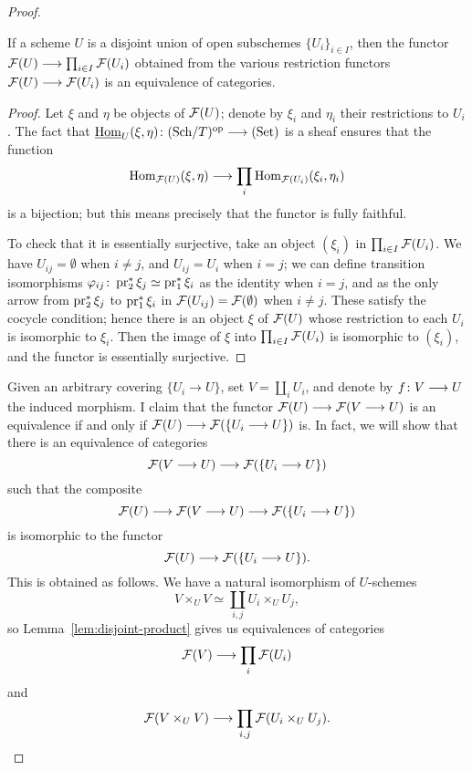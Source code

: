 \begin{4   STACKS}
\begin{4.2 Descent for quasi-coherent sheaves}
\begin{proof}
\begin{lemma}\label{lem:disjoint-product}
If a scheme $U$ is a disjoint union of open subschemes $\{U_i\}_{i \in I}$, then the functor $\cF(U) \arr \prod_{i \in I} \cF(U_i)$ obtained from the various restriction functors $\cF(U) \arr \cF(U_i)$ is an equivalence of categories.
\end{lemma}

\begin{proof}
Let $\xi$ and $\eta$ be objects of $\mathcal{F}(U)$; denote by $\xi_i$ and $\eta_i$ their restrictions to $U_i$. The fact that $\underhom_U(\xi, \eta) \colon \catsch{T}\op \arr \catset$ is a sheaf ensures that the function
   \[
   \hom_{\cF(U)}(\xi, \eta) \arr
   \prod_i \hom_{\cF(U_i)}(\xi_i, \eta_i)
   \]
is a bijection; but this means precisely that the functor is fully faithful.

To check that it is essentially surjective, take an object $(\xi_i)$ in $\prod_{i \in I}\mathcal{F}(U_i)$. We have $U_{ij} = \emptyset$ when $i \neq j$, and $U_{ij} = U_i$ when $i = j$; we can define transition isomorphisms $\varphi_{ij} \colon \operatorname{pr}_2^* \xi_j \simeq \operatorname{pr}_1^* \xi_i$ as the identity when $i = j$, and as the only arrow from $\operatorname{pr}_2^* \xi_j$ to $\operatorname{pr}_1^* \xi_i$ in $\mathcal{F}(U_{ij}) = \mathcal{F}(\emptyset)$  when $i \neq j$. These satisfy the cocycle condition; hence there is an object $\xi$ of $\mathcal{F}(U)$ whose restriction to each $U_i$ is isomorphic to $\xi_i$. Then the image of $\xi$ into $\prod_{i \in I} \mathcal{F}(U_i)$ is isomorphic to $(\xi_i)$, and the functor is essentially surjective.
\end{proof}

Given an arbitrary covering $\{U_i \to U\}$, set $V = \coprod_i U_i$, and denote by $f \colon V \arr U$ the induced morphism. I claim that the functor $\cF(U) \arr \cF(V \to U)$ is an equivalence if and only if $\cF(U) \arr \cF(\{U_i \to U\})$ is. In fact, we will show that there is an equivalence of categories
   \[
   \cF(V \to U) \arr \cF(\{U_i \to U\})
   \]
such that the composite
   \[
   \cF(U) \arr \cF(V \to U)
   \arr \cF(\{U_i \to U\})
   \]
is isomorphic to the functor
   \[
    \cF(U) \arr \cF(\{U_i \to U\}).
   \]
This is obtained as follows. We have a natural isomorphism of $U$-schemes
   \[
   V \times_U V \simeq \coprod_{i,j} U_i \times_U U_j,
   \]
so Lemma~\ref{lem:disjoint-product} gives us equivalences of categories
   \begin{equation}\label{eq:first-equivalence}
   \cF(V) \arr \prod_i \cF(U_i)
   \end{equation}
and
   \begin{equation}\label{eq:second-equivalence}
    \cF(V \times_U V) \arr
   \prod_{i,j}\cF(U_i \times_U U_j).
   \end{equation}


\end{proof}
\end{4.2 Descent for quasi-coherent sheaves}
\end{4   STACKS}
